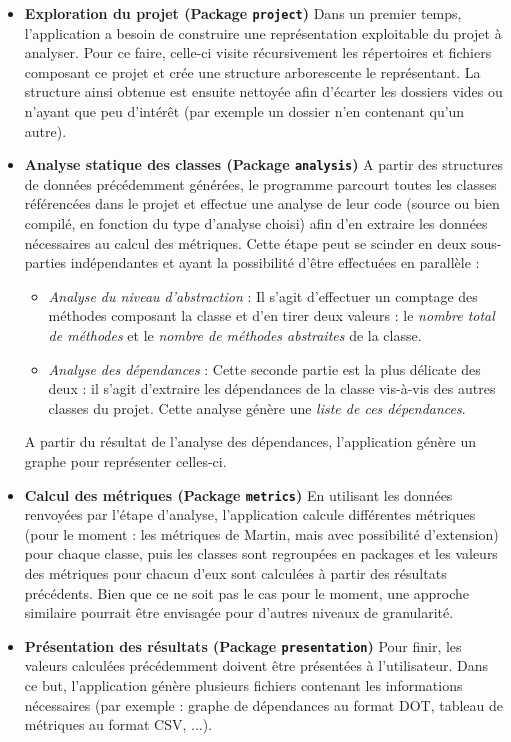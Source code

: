 \documentclass{scrartcl}
\begin{document}
    \begin{itemize}
        \bigbreak 
        \item[] \textbf{Exploration du projet (Package \texttt{project})} Dans un premier temps, l'application a besoin de construire une représentation exploitable du projet à analyser. Pour ce faire, celle-ci visite récursivement les répertoires et fichiers composant ce projet et crée une structure arborescente le représentant. La structure ainsi obtenue est ensuite nettoyée afin d'écarter les dossiers vides ou n'ayant que peu d'intérêt (par exemple un dossier n'en contenant qu'un autre).

        \bigbreak 
        \item[] \textbf{Analyse statique des classes (Package \texttt{analysis})} A partir des structures de données précédemment générées, le programme parcourt toutes les classes référencées dans le projet et effectue une analyse de leur code (source ou bien compilé, en fonction du type d'analyse choisi) afin d'en extraire les données nécessaires au calcul des métriques. Cette étape peut se scinder en deux sous-parties indépendantes et ayant la possibilité d'être effectuées en parallèle :
    	\begin{itemize}
    		\item \textit{Analyse du niveau d'abstraction} : Il s'agit d'effectuer un comptage des méthodes composant la classe et d'en tirer deux valeurs : le \emph{nombre total de méthodes} et le \emph{nombre de méthodes abstraites} de la classe.
    		\item \textit{Analyse des dépendances} : Cette seconde partie est la plus délicate des deux : il s'agit d'extraire les dépendances de la classe vis-à-vis des autres classes du projet. Cette analyse génère une \emph{liste de ces dépendances}.
    	\end{itemize}
	    A partir du résultat de l'analyse des dépendances, l'application génère un graphe pour représenter celles-ci.
	
	    \bigbreak 
	    \item[] \textbf{Calcul des métriques (Package \texttt{metrics})} En utilisant les données renvoyées par l'étape d'analyse, l'application calcule différentes métriques (pour le moment : les métriques de Martin, mais avec possibilité d'extension) pour chaque classe, puis les classes sont regroupées en packages et les valeurs des métriques pour chacun d'eux sont calculées à partir des résultats précédents. Bien que ce ne soit pas le cas pour le moment, une approche similaire pourrait être envisagée pour d'autres niveaux de granularité.
	
	    \bigbreak 
	    \item[] \textbf{Présentation des résultats (Package \texttt{presentation})} Pour finir, les valeurs calculées précédemment doivent être présentées à l'utilisateur. Dans ce but, l'application génère plusieurs fichiers contenant les informations nécessaires (par exemple : graphe de dépendances au format DOT, tableau de métriques au format CSV, ...).
	\end{itemize}
\end{document}
